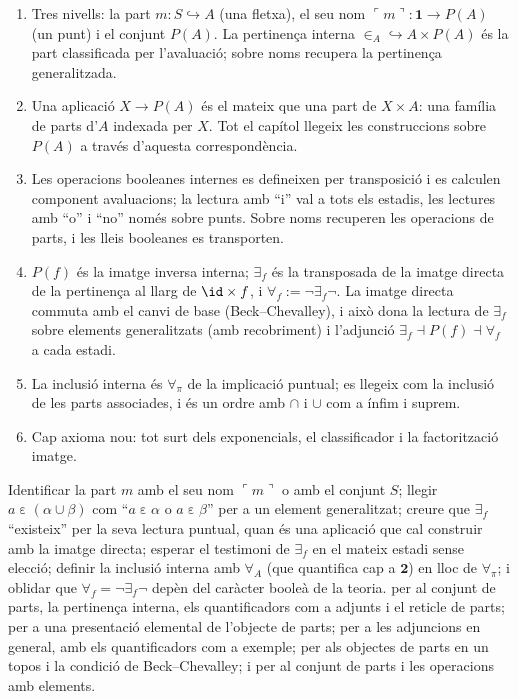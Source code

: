 \begin{resumcap}
\begin{enumerate}
  \item Tres nivells: la part \(m\colon S\hookrightarrow A\) (una fletxa), el seu nom \(\ulcorner m\urcorner\colon\mathbf1\to P(A)\) (un punt) i el conjunt \(P(A)\). La pertinença interna \(\in_A\hookrightarrow A\times P(A)\) és la part classificada per l'avaluació; sobre noms recupera la pertinença generalitzada.
  \item Una aplicació \(X\to P(A)\) és el mateix que una part de \(X\times A\): una família de parts d'\(A\) indexada per \(X\). Tot el capítol llegeix les construccions sobre \(P(A)\) a través d'aquesta correspondència.
  \item Les operacions booleanes internes es defineixen per transposició i es calculen component avaluacions; la lectura amb \enquote{i} val a tots els estadis, les lectures amb \enquote{o} i \enquote{no} només sobre punts. Sobre noms recuperen les operacions de parts, i les lleis booleanes es transporten.
  \item \(P(f)\) és la imatge inversa interna; \(\exists_f\) és la transposada de la imatge directa de la pertinença al llarg de \(\id\times f\), i \(\forall_f:=\neg\exists_f\neg\). La imatge directa commuta amb el canvi de base (Beck--Chevalley), i això dona la lectura de \(\exists_f\) sobre elements generalitzats (amb recobriment) i l'adjunció \(\exists_f\dashv P(f)\dashv\forall_f\) a cada estadi.
  \item La inclusió interna és \(\forall_\pi\) de la implicació puntual; es llegeix com la inclusió de les parts associades, i és un ordre amb \(\cap\) i \(\cup\) com a ínfim i suprem.
  \item Cap axioma nou: tot surt dels exponencials, el classificador i la factorització imatge.
\end{enumerate}
 Identificar la part \(m\) amb el seu nom \(\ulcorner m\urcorner\) o amb el conjunt \(S\); llegir \(a\mathrel{\varepsilon}(\alpha\cup\beta)\) com \enquote{\(a\mathrel{\varepsilon}\alpha\) o \(a\mathrel{\varepsilon}\beta\)} per a un element generalitzat; creure que \(\exists_f\) \enquote{existeix} per la seva lectura puntual, quan és una aplicació que cal construir amb la imatge directa; esperar el testimoni de \(\exists_f\) en el mateix estadi sense elecció; definir la inclusió interna amb \(\forall_A\) (que quantifica cap a \(\mathbf2\)) en lloc de \(\forall_\pi\); i oblidar que \(\forall_f=\neg\exists_f\neg\) depèn del caràcter booleà de la teoria.
 \cite[cap.~7--8]{lawvere-rosebrugh} per al conjunt de parts, la pertinença interna, els quantificadors com a adjunts i el reticle de parts; \cite[article~VI, sessions~32--33]{lawvere-schanuel} per a una presentació elemental de l'objecte de parts; \cite[cap.~9]{awodey} per a les adjuncions en general, amb els quantificadors com a exemple; \cite[cap.~IV]{maclane-moerdijk} per als objectes de parts en un topos i la condició de Beck--Chevalley; i \cite[§§5--9]{halmos} per al conjunt de parts i les operacions amb elements.
\end{resumcap}
